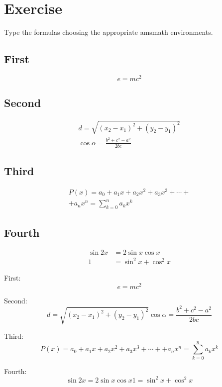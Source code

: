 \section{Exercise}
\begin{staticpart}
Type the formulas choosing the appropriate amsmath environments.
\subsection{First}
\begin{equation}
  e=mc^2
\end{equation}

\subsection{Second}
\begin{gather*}
  d = \sqrt{ (x_2 - x_1)^2 + (y_2 - y_1)^2 } \\
  \cos \alpha = \frac{b^2 + c^2 - a^2}{2bc}
\end{gather*}

\subsection{Third}
\begin{multline*}
    P(x) = a_0 + a_1 x + a_2 x^2 + a_3 x^3 + \cdots + \\
    + a_n x^n = \sum_{k=0}^n a_k x^k
\end{multline*}

\subsection{Fourth}
\begin{align}
    \sin 2x &= 2 \sin x \cos x \\
    1 &= \sin ^2 x + \cos ^2 x
\end{align}

\end{staticpart}

First:
\[
  e=mc^2
\]

\par Second:
\[
  d = \sqrt{ (x_2 - x_1)^2 + (y_2 - y_1)^2 }
  \cos \alpha = \frac{b^2 + c^2 - a^2}{2bc}
\]

\par Third:
\[
  P(x) = a_0 + a_1 x + a_2 x^2 + a_3 x^3 + \cdots +
  + a_n x^n = \sum_{k=0}^n a_k x^k
\]

\par Fourth:
\[
  \sin 2x = 2 \sin x \cos x
  1 = \sin ^2 x + \cos ^2 x
\]

